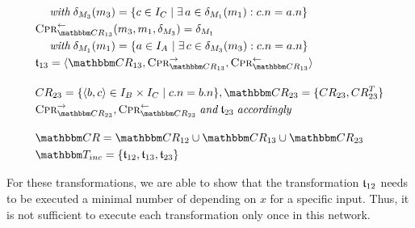 \begin{align*}
    & \formulaskip
    \withmath \change{\metamodel{M}{3}}(\model{m}{3}) = \setted{c \in \instances{\class{C}{}} \mid \exists a \in \change{\metamodel{M}{1}}(\model{m}{1}) : c.n = a.n} \\
    & 
    \consistencypreservationrule{\consistencyrelationset{CR}_{13}}^{\leftarrow}(\model{m}{3}, \model{m}{1}, \change{\metamodel{M}{3}}) = \change{\metamodel{M}{1}} \\
    & \formulaskip
    \withmath \change{\metamodel{M}{1}}(\model{m}{1}) = \setted{a \in \instances{\class{A}{}} \mid \exists c \in \change{\metamodel{M}{3}}(\model{m}{3}) : c.n = a.n} \\
    & 
    \transformation{t}_{13} = \tupled{\consistencyrelationset{CR}_{13}, \consistencypreservationrule{\consistencyrelationset{CR}_{13}}^{\rightarrow}, \consistencypreservationrule{\consistencyrelationset{CR}_{13}}^{\leftarrow}} \\[1em]
    &
    \consistencyrelation{CR}{23} = \setted{\tupled{b,c} \in \instances{\class{B}{}} \times \instances{\class{C}{}} \mid c.n = b.n}, \consistencyrelationset{CR}_{23} = \setted{\consistencyrelation{CR}{23}, \consistencyrelation{CR}{23}^T} \\
    & 
    \consistencypreservationrule{\consistencyrelationset{CR}_{23}}^{\rightarrow}, \consistencypreservationrule{\consistencyrelationset{CR}_{23}}^{\leftarrow} \andmath \transformation{t}_{23} \mathtextspacearound{accordingly} \\[1em]
    &
    \consistencyrelationset{CR} = \consistencyrelationset{CR}_{12} \cup \consistencyrelationset{CR}_{13} \cup \consistencyrelationset{CR}_{23} \\
    &
    \transformationset{T}_{inc} = \setted{\transformation{t}_{12}, \transformation{t}_{13}, \transformation{t}_{23}}
\end{align*}

For these transformations, we are able to show that the transformation $\mathfrak{t}_{12}$ needs to be executed a minimal number of depending on $x$ for a specific input.
Thus, it is not sufficient to execute each transformation only once in this network.

